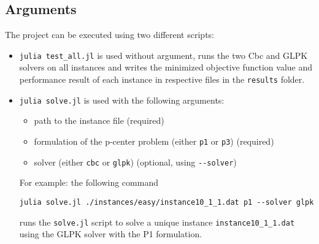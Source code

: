\subsection{Arguments}
The project can be executed using two different scripts:
\begin{itemize}
	\item \verb+julia test_all.jl+ is used without argument, runs the two Cbc and GLPK solvers on all instances and writes the minimized objective function value and performance result of each instance in respective files in the \verb+results+ folder.
	\item \verb+julia solve.jl+ is used with the following arguments:
		\begin{itemize}
		\item path to the instance file (required)
		\item formulation of the p-center problem (either \verb+p1+ or \verb+p3+) (required)
		\item solver (either \verb+cbc+ or \verb+glpk+) (optional, using \verb+--solver+)
		\end{itemize}
	For example: the following command
	\begin{center}
		\verb+julia solve.jl ./instances/easy/instance10_1_1.dat p1 --solver glpk+
	\end{center}	 
	runs the \verb+solve.jl+ script to solve a unique instance \verb+instance10_1_1.dat+ using the GLPK solver with the P1 formulation. 
\end{itemize}